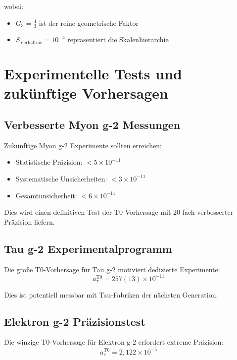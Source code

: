 \documentclass[12pt,a4paper]{report}
\begin{document}
wobei:
\begin{itemize}
	\item $G_3 = \frac{4}{3}$ ist der reine geometrische Faktor
	\item $S_{\text{Verhältnis}} = 10^{-4}$ repräsentiert die Skalenhierarchie
\end{itemize}

\section{Experimentelle Tests und zukünftige Vorhersagen}
\label{sec:experimental_tests}

\subsection{Verbesserte Myon g-2 Messungen}
\label{subsec:improved_muon_measurements}

Zukünftige Myon g-2 Experimente sollten erreichen:
\begin{itemize}
	\item Statistische Präzision: $< 5 \times 10^{-11}$
	\item Systematische Unsicherheiten: $< 3 \times 10^{-11}$
	\item Gesamtunsicherheit: $< 6 \times 10^{-11}$
\end{itemize}

Dies wird einen definitiven Test der T0-Vorhersage mit 20-fach verbesserter Präzision liefern.

\subsection{Tau g-2 Experimentalprogramm}
\label{subsec:tau_g2_program}

Die große T0-Vorhersage für Tau g-2 motiviert dedizierte Experimente:
\begin{equation}
	a_\tau^{\text{T0}} = 257(13) \times 10^{-11}
	\label{eq:tau_prediction}
\end{equation}

Dies ist potentiell messbar mit Tau-Fabriken der nächsten Generation.

\subsection{Elektron g-2 Präzisionstest}
\label{subsec:electron_g2_precision}

Die winzige T0-Vorhersage für Elektron g-2 erfordert extreme Präzision:
\begin{equation}
	a_e^{\text{T0}} = 2,122 \times 10^{-5}
	\label{eq:electron_prediction}
\end{equation}
\end{document}
